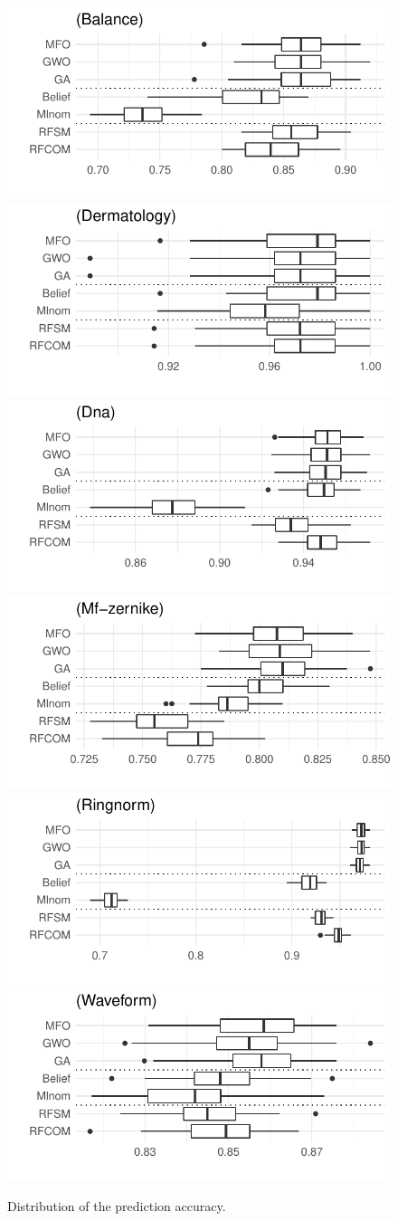  \begin{figure}[!ht]
\begin{center}
  \includegraphics[width=.49\textwidth]{4_Taxonomy/figures/boxplot-Balance.pdf}
  \includegraphics[width=.49\textwidth]{4_Taxonomy/figures/boxplot-Dermatology.pdf} \\
  \includegraphics[width=.49\textwidth]{4_Taxonomy/figures/boxplot-Dna.pdf}
  \includegraphics[width=.49\textwidth]{4_Taxonomy/figures/boxplot-Mf-zernike.pdf}\\
  \includegraphics[width=.49\textwidth]{4_Taxonomy/figures/boxplot-Ringnorm.pdf}
  \includegraphics[width=.49\textwidth]{4_Taxonomy/figures/boxplot-Waveform.pdf}
\end{center}
\caption{Distribution of the prediction accuracy.}
\label{consprediction}
\end{figure}

